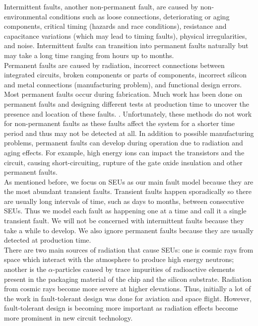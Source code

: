 \documentclass[12pt]{report}
\begin{document}
Intermittent faults, another non-permanent fault, are caused by non-environmental conditions such as loose connections, deteriorating or aging components, critical timing (hazards and race conditions), resistance and capacitance variations (which may lead to timing faults), physical irregularities, and noise.  Intermittent faults can transition into permanent faults naturally but may take a long time ranging from hours up to months. \\

Permanent faults are caused by radiation, incorrect connections between integrated circuits, broken components or parts of components, incorrect silicon and metal connections (manufacturing problem), and functional design errors. Most permanent faults occur during fabrication. Much work has been done on permanent faults and designing different tests at production time to uncover the presence and location of these faults. \cite{jha_gupta_2003} \cite{giz_book_2006}.  Unfortunately, these methods do not work for non-permanent faults as these faults affect the system for a shorter time period and thus may not be detected at all.  In addition to possible manufacturing problems, permanent faults can develop during operation due to radiation and aging effects.  For example, high energy ions can impact the transistors and the circuit, causing short-circuiting, rupture of the gate oxide insulation and other permanent faults.\\ %

As mentioned before, we focus on SEUs as our main fault model because they are the most abundant transient faults.  Transient faults happen sporadically so there are usually long intervals of time, such as days to months, between consecutive SEUs.  Thus we model each fault as happening one at a time and call it a single transient fault.  We will not be concerned with intermittent faults because they take a while to develop.  We also ignore permanent faults because they are usually detected at production time.  \\

There are two main sources of radiation that cause SEUs: one is cosmic rays from space which interact with the atmosphere to produce high energy neutrons; another is the $\alpha$-particles caused by trace impurities of radioactive elements present in the packaging material of the chip and the silicon substrate. Radiation from cosmic rays become more severe at higher elevations. Thus, initially a lot of the work in fault-tolerant design was done for aviation and space flight.  However, fault-tolerant design is becoming more important as radiation effects become more prominent in new circuit technology.
\end{document}

